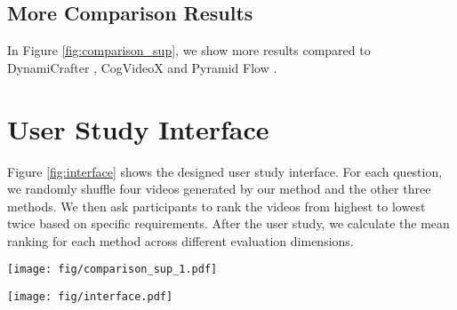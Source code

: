 \subsection{More Comparison Results}
In Figure \ref{fig:comparison_sup}, we show more results compared to DynamiCrafter \cite{xing2025dynamicrafter}, CogVideoX \cite{yang2024cogvideox} and Pyramid Flow \cite{jin2024pyramidal}.

\section{User Study Interface}
Figure \ref{fig:interface} shows the designed user study interface. For each question, we randomly shuffle four videos generated by our method and the other three methods. We then ask participants to rank the videos from highest to lowest twice based on specific requirements. After the user study, we calculate the mean ranking for each method across different evaluation dimensions.

\begin{figure*}[h]
\centering
\texttt{[image: fig/comparison\_sup\_1.pdf]}
\caption{More comparison results of controllable I2V generation on our benchmark. The motion described in the text is in \textbf{bold}.}
\label{fig:comparison_sup}
\end{figure*}

\begin{figure*}[h]
\centering
\texttt{[image: fig/interface.pdf]}
\caption{User study interface. Each participant is required to evaluate 30 groups of videos and respond to two corresponding
sub-questions for each group. Due to the page limit, only one group of videos and two sub-questions are shown here.}
\label{fig:interface}
\end{figure*}

